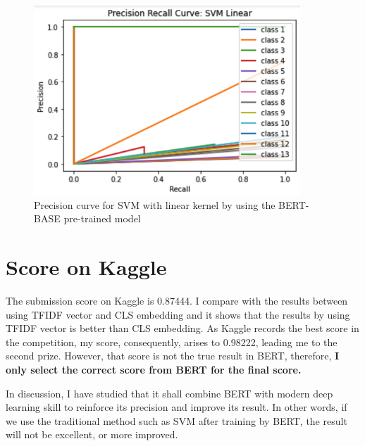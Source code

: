 \documentclass[a4paper]{article}
\theoremstyle{plain}
\begin{document}
\begin{figure}[htp]
    \centering
    \includegraphics[width=10cm]{fig/curve.png}
    \caption{Precision curve for SVM with linear kernel 
    by using the BERT-BASE pre-trained model}
    \label{fig:galaxy}
\end{figure}

\section{Score on Kaggle}%
\label{sec:Score on Kaggle}
The submission score on Kaggle is 0.87444. I compare with the results between using 
TFIDF vector and CLS embedding and it shows that the results by using TFIDF vector is better than 
CLS embedding. As Kaggle records the best score in the competition, my score, consequently,
arises to 0.98222, leading me to the second prize. However, that score is not the true result
in BERT, therefore, {\bf I only select the correct score from BERT for the final score.}

In discussion, I have studied that it shall combine BERT with modern deep learning skill to 
reinforce its precision and improve its result. In other words, 
if we use the traditional method such as SVM after training by BERT,
the result will not be excellent, or more improved.
\end{document}
